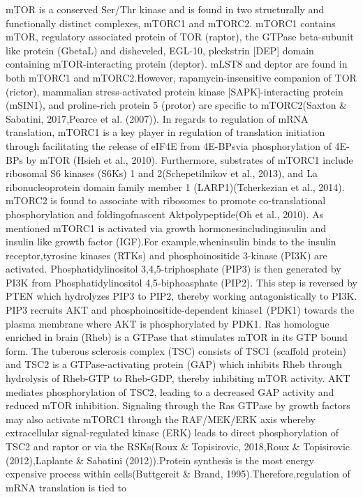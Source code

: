 \documentclass[12pt,openany]{book}
\begin{document}
mTOR is a conserved Ser/Thr kinase and is found in two structurally and
functionally distinct complexes, mTORC1 and mTORC2. mTORC1 contains
mTOR, regulatory associated protein of TOR (raptor), the GTPase
beta-subunit like protein (GbetaL) and disheveled, EGL-10, pleckstrin
{[}DEP{]} domain containing mTOR-interacting protein (deptor). mLST8 and
deptor are found in both mTORC1 and mTORC2.However,
rapamycin-insensitive companion of TOR (rictor), mammalian
stress-activated protein kinase {[}SAPK{]}-interacting protein (mSIN1),
and proline-rich protein 5 (protor) are specific to mTORC2(Saxton \&
Sabatini, 2017,Pearce et al. (2007)). In regards to regulation of mRNA
translation, mTORC1 is a key player in regulation of translation
initiation through facilitating the release of eIF4E from 4E-BPsvia
phosphorylation of 4E-BPs by mTOR (Hsieh et al., 2010). Furthermore,
substrates of mTORC1 include ribosomal S6 kinases (S6Ks) 1 and
2(Schepetilnikov et al., 2013), and La ribonucleoprotein domain family
member 1 (LARP1)(Tcherkezian et al., 2014). mTORC2 is found to associate
with ribosomes to promote co-translational phosphorylation and
foldingofnascent Aktpolypeptide(Oh et al., 2010). As mentioned mTORC1 is
activated via growth hormonesincludinginsulin and insulin like growth
factor (IGF).For example,wheninsulin binds to the insulin
receptor,tyrosine kinases (RTKs) and phosphoinositide 3-kinase (PI3K)
are activated. Phosphatidylinositol 3,4,5-triphosphate (PIP3) is then
generated by PI3K from Phosphatidylinositol 4,5-biphoasphate (PIP2).
This step is reversed by PTEN which hydrolyzes PIP3 to PIP2, thereby
working antagonistically to PI3K. PIP3 recruits AKT and
phosphoinositide-dependent kinase1 (PDK1) towards the plasma membrane
where AKT is phosphorylated by PDK1. Ras homologue enriched in brain
(Rheb) is a GTPase that stimulates mTOR in its GTP bound form. The
tuberous sclerosis complex (TSC) consists of TSC1 (scaffold protein) and
TSC2 is a GTPase-activating protein (GAP) which inhibits Rheb through
hydrolysis of Rheb-GTP to Rheb-GDP, thereby inhibiting mTOR activity.
AKT mediates phosphorylation of TSC2, leading to a decreased GAP
activity and reduced mTOR inhibition. Signaling through the Ras GTPase
by growth factors may also activate mTORC1 through the RAF/MEK/ERK axis
whereby extracellular signal-regulated kinase (ERK) leads to direct
phosphorylation of TSC2 and raptor or via the RSKs(Roux \& Topisirovic,
2018,Roux \& Topisirovic (2012),Laplante \& Sabatini (2012)).Protein
synthesis is the most energy expensive process within cells(Buttgereit
\& Brand, 1995).Therefore,regulation of mRNA translation is tied to
\end{document}

